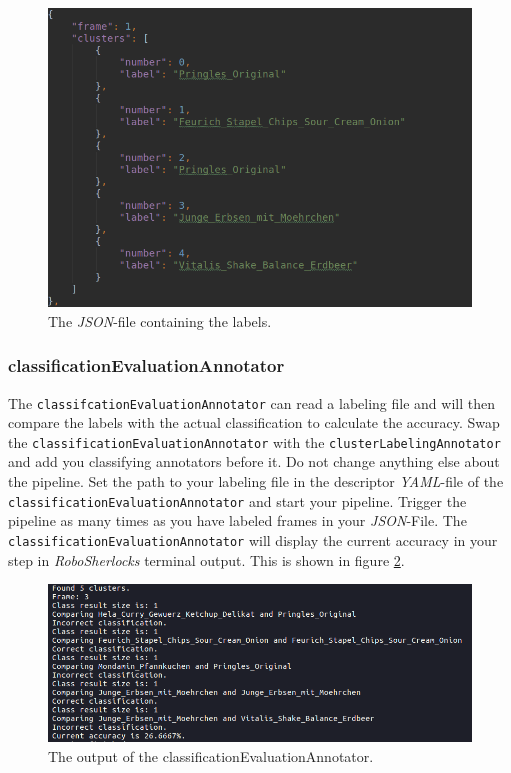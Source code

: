\documentclass[main.tex]{subfiles}
\begin{document}
\begin{figure}
  \includegraphics[width=\linewidth]{pictures/perception/labeling_file.png}
  \caption{The \textit{JSON}-file containing the labels.}
  \label{fig:labeling file}
\end{figure}


\subsubsection{classificationEvaluationAnnotator}
The \texttt{classifcationEvaluationAnnotator} can read a labeling file and will then compare the labels with the actual classification to calculate the accuracy. Swap the \texttt{classificationEvaluationAnnotator} with the \texttt{clusterLabelingAnnotator} and add you classifying annotators before it. Do not change anything else about the pipeline. Set the path to your labeling file in the descriptor \textit{YAML}-file of the \texttt{classificationEvaluationAnnotator} and start your pipeline. Trigger the pipeline as many times as you have labeled frames in your \textit{JSON}-File. The \texttt{classificationEvaluationAnnotator} will display the current accuracy in your step in \textit{RoboSherlocks} terminal output. This is shown in figure \ref{fig:classificationEvaluationAnnotator output}.

\begin{figure}
  \includegraphics[width=\linewidth]{pictures/perception/accuracy.png}
  \caption{The output of the classificationEvaluationAnnotator.}
  \label{fig:classificationEvaluationAnnotator output}
\end{figure}
\end{document}
